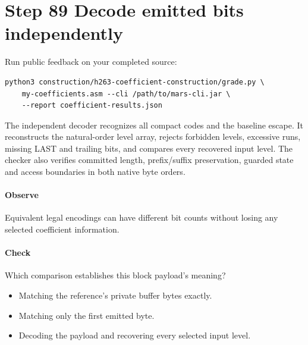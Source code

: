 \section{Step 89 Decode emitted bits independently}\label{h263-coeff-s09}
Run public feedback on your completed source:
\begin{verbatim}
python3 construction/h263-coefficient-construction/grade.py \
    my-coefficients.asm --cli /path/to/mars-cli.jar \
    --report coefficient-results.json
\end{verbatim}
The independent decoder recognizes all compact codes and the baseline escape.
It reconstructs the natural-order level array, rejects forbidden levels, excessive
runs, missing LAST and trailing bits, and compares every recovered input level.
The checker also verifies committed length, prefix/suffix preservation, guarded
state and access boundaries in both native byte orders.

\paragraph{Observe} Equivalent legal encodings can have different bit counts
without losing any selected coefficient information.
\Needspace{8\baselineskip}
\paragraph{Check} Which comparison establishes this block payload's meaning?
\begin{itemize}
  \item[A.] Matching the reference's private buffer bytes exactly.
  \item[B.] Matching only the first emitted byte.
  \item[C.] Decoding the payload and recovering every selected input level.
\end{itemize}
